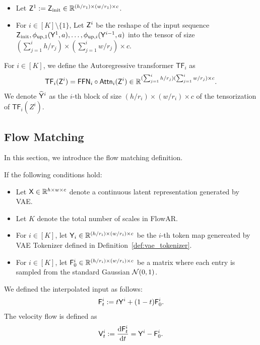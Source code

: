 \begin{definition}
\begin{itemize}
        \item Let $\mathsf{Z}^1 : = \mathsf{Z}_{\mathrm{init}} \in \mathbb{R}^{(h/r_1) \times (w/r_1) \times c}$.
        \item For $i \in [K] \setminus \{1\}$, Let $\mathsf{Z}^{i}$ be the reshape of the input sequence $\mathsf{Z}_{\mathrm{init}}, \phi_{\mathrm{up}, 1}(\mathsf{Y}^1, a), \ldots, \phi_{\mathrm{up}, i}(\mathsf{Y}^{i-1}, a)$ into the tensor of size $(\sum_{j=1}^i h /r_{j}) \times (\sum_{j=1}^i w /r_{j}) \times c$.
    \end{itemize}
    For $i \in [K]$, we define the Autoregressive transformer $\mathsf{TF}_i$ as 
    \begin{align*}
        \mathsf{TF}_i(\mathsf{Z}^i) = \mathsf{FFN}_i \circ \mathsf{Attn}_i (\mathsf{Z}^i) \in \mathbb{R}^{(\sum_{j=1}^{i} h /r_{j})(\sum_{j=1}^{i} w /r_{j}) \times c}.
    \end{align*}
    We denote $\widehat{\mathsf{Y}}^i$ as the $i$-th block of size $(h/r_{i}) \times (w/r_{i}) \times c$ of the tensorization of $\mathsf{TF}_i(Z^i)$.
\end{definition}


\subsection{Flow Matching}
In this section, we introduce the flow matching definition.

\begin{definition}[Flow]\label{def:flow}
    If the following conditions hold:
    \begin{itemize}
        \item Let $\mathsf{X} \in \mathbb{R}^{h \times w \times c}$ denote a continuous latent representation generated by VAE.
        \item Let $K$ denote the total number of scales in FlowAR.
        \item For $i \in [K]$, let $\mathsf{Y}_i \in \mathbb{R}^{(h / r_i) \times (w/r_i) \times c}$ be the $i$-th token map genereated by VAE Tokenizer defined in Definition~\ref{def:vae_tokenizer}.
        \item For $i \in [K]$, let $\mathsf{F}^i_0 \in \mathbb{R}^{(h / r_i) \times (w/r_i) \times c}$ be a matrix where each entry is sampled from the standard Gaussian $\mathcal{N}(0,1)$.
    \end{itemize}
    We defined the interpolated input as follows:
    \begin{align*}
        \mathsf{F}^i_{t} := t \mathsf{Y}^i + (1-t)\mathsf{F}^i_0.
    \end{align*}
    The velocity flow is defined as
    \begin{align*}
        \mathsf{V}^i_t := \frac{\mathrm{d} \mathsf{F}^i_{t}}{\mathrm{d} t} = \mathsf{Y}^i -\mathsf{F}^i_0.
    \end{align*}
\end{definition}




